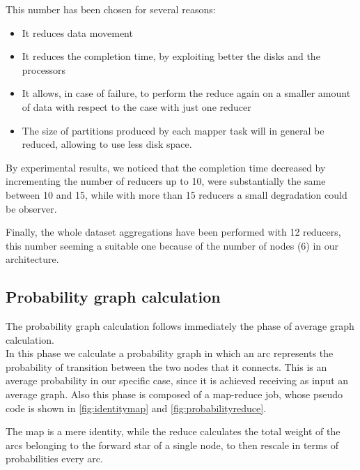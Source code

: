 This number has been chosen for several reasons:
\begin{itemize}
\item It reduces data movement
\item It reduces the completion time, by exploiting better the disks and the processors
\item It allows, in case of failure, to perform the reduce again on a smaller amount of data with respect to the case with just one reducer
\item The size of partitions produced by each mapper task will in general be reduced, allowing to use less disk space.
\end{itemize}

By experimental results, we noticed that the completion time decreased by incrementing the number of reducers up to 10, were substantially the same between 10 and 15, while with more than 15 reducers a small degradation could be observer. 

Finally, the whole dataset aggregations have been performed with 12 reducers, this number seeming a suitable one because of the number of nodes (6) in our architecture. 

\subsection{Probability graph calculation}
The probability graph calculation follows immediately the phase of average graph calculation.\\
In this phase we calculate a probability graph in which an arc represents the probability of transition between the two nodes that it connects. 
This is an average probability in our specific case, since it is achieved receiving as input an average graph.
Also this phase is composed of a map-reduce job, whose pseudo code is shown in \ref{fig:identitymap} and \ref{fig:probabilityreduce}.

The map is a mere identity, while the reduce calculates the total weight of the arcs belonging to the forward star of a single node, to then rescale in terms of probabilities every arc.
  
